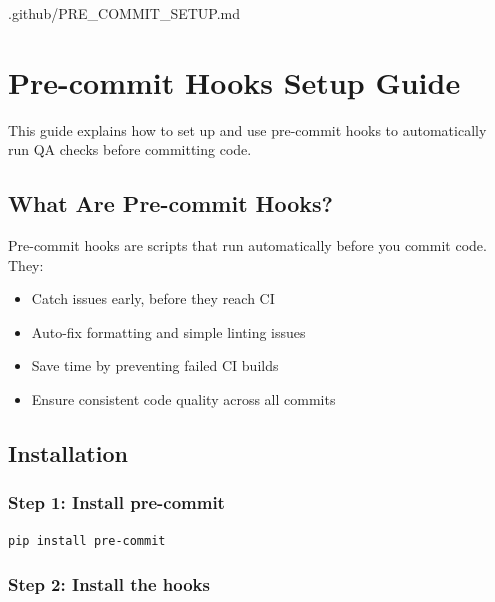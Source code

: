 \begin{relocated}{.github/PRE_COMMIT_SETUP.md}
\section{Pre-commit Hooks Setup Guide}\label{um:flow:pre-commit-setup}

This guide explains how to set up and use pre-commit hooks to
automatically run QA checks before committing code.

\subsection{What Are Pre-commit Hooks?}\label{um:flow:pre-commit-setup:what-are-pre-commit-hooks}

Pre-commit hooks are scripts that run automatically before you commit
code. They:

\begin{itemize}
\tightlist
\item
  \ok{} Catch issues early, before they reach CI
\item
  \ok{} Auto-fix formatting and simple linting issues
\item
  \ok{} Save time by preventing failed CI builds
\item
  \ok{} Ensure consistent code quality across all commits
\end{itemize}

\subsection{Installation}\label{um:flow:pre-commit-setup:installation}

\subsubsection{Step 1: Install pre-commit}\label{um:flow:pre-commit-setup:step-1-install-pre-commit}

\begin{lstlisting}[language=bash]
pip install pre-commit
\end{lstlisting}

\subsubsection{Step 2: Install the hooks}\label{um:flow:pre-commit-setup:step-2-install-the-hooks}


\end{relocated}
